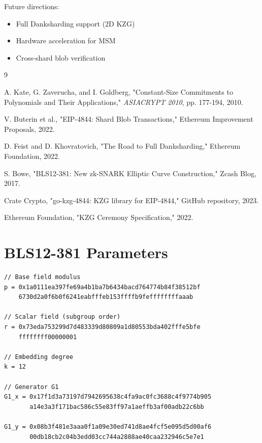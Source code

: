 \documentclass[11pt,a4paper]{article}
\theoremstyle{definition}
\begin{document}
Future directions:
\begin{itemize}
    \item Full Danksharding support (2D KZG)
    \item Hardware acceleration for MSM
    \item Cross-shard blob verification
\end{itemize}

\begin{thebibliography}{9}

A. Kate, G. Zaverucha, and I. Goldberg, "Constant-Size Commitments to Polynomials and Their Applications," \textit{ASIACRYPT 2010}, pp. 177-194, 2010.

V. Buterin et al., "EIP-4844: Shard Blob Transactions," Ethereum Improvement Proposals, 2022.

D. Feist and D. Khovratovich, "The Road to Full Danksharding," Ethereum Foundation, 2022.

S. Bowe, "BLS12-381: New zk-SNARK Elliptic Curve Construction," Zcash Blog, 2017.

Crate Crypto, "go-kzg-4844: KZG library for EIP-4844," GitHub repository, 2023.

Ethereum Foundation, "KZG Ceremony Specification," 2022.

\end{thebibliography}

\appendix

\section{BLS12-381 Parameters}

\begin{lstlisting}[caption={BLS12-381 Field Parameters}]
// Base field modulus
p = 0x1a0111ea397fe69a4b1ba7b6434bacd764774b84f38512bf
    6730d2a0f6b0f6241eabfffeb153ffffb9feffffffffaaab

// Scalar field (subgroup order)
r = 0x73eda753299d7d483339d80809a1d80553bda402fffe5bfe
    ffffffff00000001

// Embedding degree
k = 12

// Generator G1
G1_x = 0x17f1d3a73197d7942695638c4fa9ac0fc3688c4f9774b905
       a14e3a3f171bac586c55e83ff97a1aeffb3af00adb22c6bb

G1_y = 0x08b3f481e3aaa0f1a09e30ed741d8ae4fcf5e095d5d00af6
       00db18cb2c04b3edd03cc744a2888ae40caa232946c5e7e1
\end{lstlisting}
\end{document}
